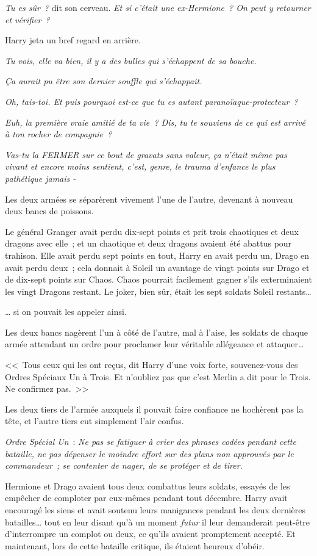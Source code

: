 \emph{Tu es sûr~?} dit son cerveau. \emph{Et si c'était une ex-Hermione~? On peut y retourner et vérifier~?}

Harry jeta un bref regard en arrière.

\emph{Tu vois, elle va bien, il y a des bulles qui s'échappent de sa bouche.}

\emph{Ça aurait pu être son dernier souffle qui s'échappait.}

\emph{Oh, tais-toi. Et puis pourquoi est-ce que tu es autant paranoïaque-protecteur~?}

\emph{Euh, la première vraie amitié de ta vie~? Dis, tu te souviens de ce qui est arrivé à ton rocher de compagnie~?}

\emph{Vas-tu la FERMER sur ce bout de gravats sans valeur, ça n'était même pas vivant et encore moins sentient, c'est, genre, le trauma d'enfance le plus pathétique jamais -}

Les deux armées se séparèrent vivement l'une de l'autre, devenant à nouveau deux bancs de poissons.

Le général Granger avait perdu dix-sept points et prit trois chaotiques et deux dragons avec elle~; et un chaotique et deux dragons avaient été abattus pour trahison. Elle avait perdu sept points en tout, Harry en avait perdu un, Drago en avait perdu deux~; cela donnait à Soleil un avantage de vingt points sur Drago et de dix-sept points sur Chaos. Chaos pourrait facilement gagner s'ils exterminaient les vingt Dragons restant. Le joker, bien sûr, était les sept soldats Soleil restants…

… si on pouvait les appeler ainsi.

Les deux bancs nagèrent l'un à côté de l'autre, mal à l'aise, les soldats de chaque armée attendant un ordre pour proclamer leur véritable allégeance et attaquer…

<<~Tous ceux qui les ont reçus, dit Harry d'une voix forte, souvenez-vous des Ordres Spéciaux Un à Trois. Et n'oubliez pas que c'est Merlin a dit pour le Trois. Ne confirmez pas.~>>

Les deux tiers de l'armée auxquels il pouvait faire confiance ne hochèrent pas la tête, et l'autre tiers eut simplement l'air confus.

\emph{Ordre Spécial Un}~: \emph{Ne pas se fatiguer à crier des phrases codées pendant cette bataille, ne pas dépenser le moindre effort sur des plans non approuvés par le commandeur~; se contenter de nager, de se protéger et de tirer.}

Hermione et Drago avaient tous deux combattus leurs soldats, essayés de les empêcher de comploter par eux-mêmes pendant tout décembre. Harry avait encouragé les siens et avait soutenu leurs manigances pendant les deux dernières batailles… tout en leur disant qu'à un moment \emph{futur} il leur demanderait peut-être d'interrompre un complot ou deux, ce qu'ils avaient promptement accepté. Et maintenant, lors de cette bataille critique, ils étaient heureux d'obéir.

